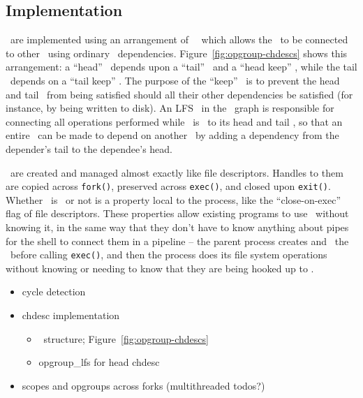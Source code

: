 \subsection{Implementation}
\label{sec:opgroup:implementation}


\Opgroups\ are implemented using an arrangement of \noop\ \chdescs\ which allows
the \opgroup\ to be connected to other \opgroups\ using ordinary \chdesc\
dependencies.  Figure~\ref{fig:opgroup-chdescs} shows this arrangement: a
``head'' \chdesc\ depends upon a ``tail'' \chdesc\ and a ``head keep'' \chdesc,
while the tail \chdesc\ depends on a ``tail keep'' \chdesc. The purpose of the
``keep'' \chdescs\ is to prevent the head and tail \chdescs\ from being
satisfied should all their other dependencies be satisfied (for instance, by
being written to disk). An LFS \module\ in the \module\ graph is responsible for
connecting all operations performed while \anopgroup\ is \engaged\ to its head
and tail \chdescs, so that an entire \opgroup\ can be made to depend on another
\opgroup\ by adding a dependency from the depender's tail to the dependee's
head.

\Opgroups\ are created and managed almost exactly like file descriptors. Handles
to them are copied across \texttt{fork()}, preserved across \texttt{exec()}, and
closed upon \texttt{exit()}. Whether \anopgroup\ is \engaged\ or not is a
property local to the process, like the ``close-on-exec'' flag of file
descriptors. These properties allow existing programs to use \opgroups\ without
knowing it, in the same way that they don't have to know anything about pipes
for the shell to connect them in a pipeline -- the parent process creates and
\engages\ the \opgroups\ before calling \texttt{exec()}, and then the process
does its file system operations without knowing or needing to know that they are
being hooked up to \anopgroup.

\begin{itemize}
\item cycle detection
\item chdesc implementation
  \begin{itemize}
  \item \chdesc\ structure; Figure~\ref{fig:opgroup-chdescs}
  \item opgroup\_lfs for head chdesc
  \end{itemize}
\item scopes and opgroups across forks (multithreaded todos?)
\end{itemize}

